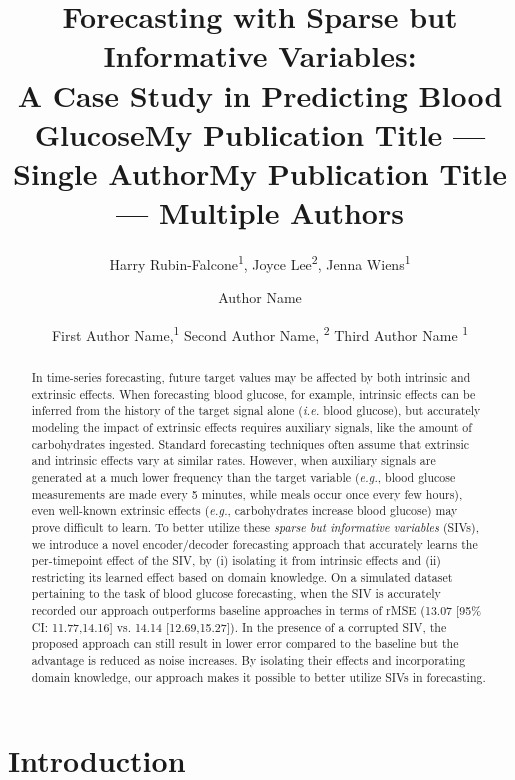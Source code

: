 \documentclass[letterpaper]{article}
\title{Forecasting with Sparse but Informative Variables:\\ A Case Study in Predicting Blood Glucose}
\author{
    Harry Rubin-Falcone\textsuperscript{\rm 1}, Joyce Lee\textsuperscript{\rm 2}, Jenna Wiens\textsuperscript{\rm 1}
}
\title{My Publication Title --- Single Author}
\author {
    Author Name
}
\title{My Publication Title --- Multiple Authors}
\author {

    First Author Name,\textsuperscript{\rm 1}
    Second Author Name, \textsuperscript{\rm 2}
    Third Author Name \textsuperscript{\rm 1}
}
\begin{document}
\maketitle

\begin{abstract}
In time-series forecasting, future target values may be affected by both intrinsic and extrinsic effects. When forecasting blood glucose, for example, intrinsic effects can be inferred from the history of the target signal alone (\textit{i.e.} blood glucose), but accurately modeling the impact of extrinsic effects requires auxiliary signals, like the amount of carbohydrates ingested. Standard forecasting techniques often assume that extrinsic and intrinsic effects vary at similar rates. However, when auxiliary signals are generated at a much lower frequency than the target variable (\textit{e.g.}, blood glucose measurements are made every 5 minutes, while meals occur once every few hours), even well-known extrinsic effects (\textit{e.g.}, carbohydrates increase blood glucose) may prove difficult to learn. To better utilize these \textit{sparse but informative variables} (SIVs), we introduce a novel encoder/decoder forecasting approach that accurately learns the per-timepoint effect of the SIV, by (i) isolating it from intrinsic effects and (ii) restricting its learned effect based on domain knowledge. On a simulated dataset pertaining to the task of blood glucose forecasting, when the SIV is accurately recorded our approach outperforms baseline approaches in terms of rMSE (13.07 [95\% CI: 11.77,14.16] vs. 14.14 [12.69,15.27]). In the presence of a corrupted SIV, the proposed approach can still result in lower error compared to the baseline but the advantage is reduced as noise increases. By isolating their effects and incorporating domain knowledge, our approach makes it possible to better utilize SIVs in forecasting.
\end{abstract}
\section{Introduction}
\end{document}
